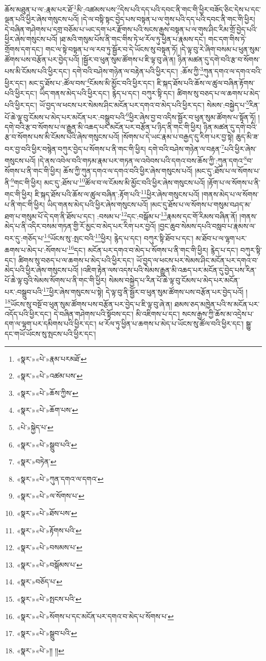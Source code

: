 ཆོས་མཐུན་པ་ལ་:རྣམ་པར་ཐོ་\footnote{«སྣར་»«པེ་»རྣམ་པརམཐོ་}མི་:འཚམས་པས་\footnote{«སྣར་»«པེ་»འཚམ་པས་}དེས་པའི་དད་པའི་དབང་ནི་གང་གི་ཕྱིར་བཟོད་ཅིང་དེས་པ་དང་ལྡན་པའི་ཕྱིར་ཞེས་གསུངས་པའོ། །དེ་ལ་བསྟི་སྟང་བྱེད་པས་བསྟན་པ་ལ་གུས་པའི་དད་པའི་དབང་ནི་གང་གི་ཕྱིར། དེ་བཞིན་གཤེགས་པ་དགྲ་བཅོམ་པ་ཡང་དག་པར་རྫོགས་པའི་སངས་རྒྱས་བསྟན་པ་ལ་གུས་ཤིང་རིམ་གྲོ་བྱེད་པའི་ཕྱིར་ཞེས་གསུངས་པའོ། །ཐ་མའི་གསུམ་པོས་ནི་གང་གིས་ཏེ་ཕ་རོལ་ཏུ་ཕྱིན་པ་རྣམས་དང་། གང་དག་གིས་ཏེ་གྲོགས་དག་དང་། གང་ལ་སྟེ་བསྟན་པ་ལ་རབ་ཏུ་སྦྱོར་བ་དེ་ཡོངས་སུ་བསྟན་ཏོ། །དེ་ལྟ་བུ་རེ་ཞིག་བསམ་པ་ཕུན་སུམ་ཚོགས་པས་བརྩོན་པར་བྱེད་པའོ། །སྦྱོར་བ་ཕུན་སུམ་ཚོགས་པ་ཇི་ལྟ་བུ་ཞེ་ན། ཉིན་མཚན་དུ་དགེ་བའི་རྩ་བ་སོགས་པས་མི་ངོམས་པའི་ཕྱིར་དང་། དགེ་བའི་བཤེས་གཉེན་ལ་བརྟེན་པའི་ཕྱིར་དང་། :ཆོས་ཀྱི་\footnote{«སྣར་»«པེ་»ཆོས་ཀྱིས་}ཀུན་དགའ་ལ་དགའ་བའི་ཕྱིར་དང་། མང་དུ་ཐོས་པ་:ཚོལ་བས་\footnote{«སྣར་»«པེ་»ཆོག་པས་}ངོམས་མི་མྱོང་བའི་ཕྱིར་དང་། ཇི་སྐད་ཐོས་པའི་ཆོས་ལ་ཚུལ་བཞིན་རྟོགས་པའི་ཕྱིར་དང་། ཡིད་གནས་མེད་པའི་ཕྱིར་དང་། རྙེད་པ་དང་། བཀུར་སྟི་དང་། ཚིགས་སུ་བཅད་པ་ལ་ཆགས་པ་མེད་པའི་ཕྱིར་དང་། ཡོ་བྱད་ལ་ཕངས་པར་སེམས་ཤིང་མངོན་པར་དགའ་བ་མེད་པའི་ཕྱིར་དང་། སེམས་:བསྐྱེད་པ་\footnote{«པེ་»སྐྱེད་པ་}རིན་པོ་ཆེ་ལྟ་བུ་ངོམས་པ་མེད་པར་མངོན་པར་:བསྒྲུབ་པའི་\footnote{«སྣར་»«པེ་»སྒྲུབ་པའི་}ཕྱིར་ཞེས་བྱ་བ་འདིས་སྦྱོར་བ་ཕུན་སུམ་ཚོགས་པ་སྟོན་ཏོ། །དགེ་བའི་རྩ་བ་སོགས་པ་ལ་རྒྱུན་མི་འཆད་པར་མངོན་པར་བརྩོན་པ་ཉིད་ནི་གང་གི་ཕྱིར། ཉིན་མཚན་དུ་དགེ་བའི་རྩ་བ་སོགས་པས་མི་ངོམས་པའི་ཞེས་གསུངས་པའོ། །སོགས་པ་དེ་ཡང་རྣམ་པ་བརྒྱད་དུ་རིག་པར་བྱ་སྟེ། ཆུད་མི་ཟ་བར་བྱ་བའི་ཕྱིར་བསྙེན་བཀུར་བྱེད་པ་སོགས་པ་ནི་གང་གི་ཕྱིར། དགེ་བའི་བཤེས་གཉེན་ལ་བརྟན་\footnote{«སྣར་»བཏེན་}པའི་ཕྱིར་ཞེས་གསུངས་པའོ། །དེ་ནས་འབེལ་བའི་གཏམ་རྣམ་པར་གཏན་ལ་འབེབས་པའི་དགའ་བས་ཆོས་ཀྱི་:ཀུན་དགའ་\footnote{«སྣར་»«པེ་»ཀུན་དགའ་ལ་དགའ་}བ་སོགས་པ་ནི་གང་གི་ཕྱིར། ཆོས་ཀྱི་ཀུན་དགའ་ལ་དགའ་བའི་ཕྱིར་ཞེས་གསུངས་པའོ། །མང་དུ་:ཐོས་པ་ལ་སོགས་པ་ནི་\footnote{«སྣར་»«པེ་»ལ་སོགས་པ་}གང་གི་ཕྱིར། མང་དུ་:ཐོས་པ་\footnote{«སྣར་»«པེ་»ཐོས་པས་}ཚོལ་བ་ལ་ངོམས་མི་མྱོང་བའི་ཕྱིར་ཞེས་གསུངས་པའོ། །རྟོག་པ་ལ་སོགས་པ་ནི་གང་གི་ཕྱིར། ཇི་སྐད་ཐོས་པའི་ཆོས་ལ་ཚུལ་བཞིན་:རྟོག་པའི་\footnote{«སྣར་»«པེ་»རྟོགས་པའི་}ཕྱིར་ཞེས་གསུངས་པའོ། །གནས་མེད་པ་ལ་སོགས་པ་ནི་གང་གི་ཕྱིར། ཡིད་གནས་མེད་པའི་ཕྱིར་ཞེས་གསུངས་པའོ། །མང་དུ་ཐོས་པ་ལ་སོགས་པ་གསུམ་བཤད་མ་ཐག་པ་གསུམ་པོ་དེ་དག་ནི་ཐོས་པ་དང་། :བསམ་པ་\footnote{«སྣར་»«པེ་»བསམས་པ་}དང་:བསྒོམ་པ་\footnote{«སྣར་»«པེ་»བསྒོམས་པ་}རྣམས་དང་གོ་རིམས་བཞིན་ནོ། །གནས་མེད་པ་ནི་འདིར་བསམ་གཏན་གྱི་རོ་མྱང་བ་མེད་པར་རིག་པར་བྱའོ། །བྱང་ཆུབ་སེམས་དཔའི་བསླབ་པ་རྣམས་ལ་བར་དུ་:གཅོད་པ་\footnote{«སྣར་»བཅོད་པ་}ཡོངས་སུ་:སྤང་བའི་\footnote{«སྣར་»«པེ་»སྤངས་པའི་}ཕྱིར། རྙེད་པ་དང་། བཀུར་སྟི་ཐོབ་པ་དང་། མ་ཐོབ་པ་ལ་ལྷག་པར་ཆགས་པ་མེད་པ་:སོགས་པ་\footnote{«སྣར་»«པེ་»སོགས་པ་དང་མངོན་པར་དགའ་བ་མེད་པ་སོགས་པ་}དང་། མངོན་པར་དགའ་བ་མེད་པ་སོགས་པ་ནི་གང་གི་ཕྱིར། རྙེད་པ་དང་། བཀུར་སྟི་དང་། ཚིགས་སུ་བཅད་པ་ལ་ཆགས་པ་མེད་པའི་ཕྱིར་དང་། ཡོ་བྱད་ལ་ཕངས་པར་སེམས་ཤིང་མངོན་པར་དགའ་བ་མེད་པའི་ཕྱིར་ཞེས་གསུངས་པའོ། །འཇིག་རྟེན་ལས་འདས་པའི་སེམས་རྒྱུན་མི་འཆད་པར་མངོན་དུ་བྱེད་པས་རིན་པོ་ཆེ་ལྟ་བུའི་སེམས་སོགས་པ་ནི་གང་གི་ཕྱིར། སེམས་བསྐྱེད་པ་རིན་པོ་ཆེ་ལྟ་བུ་ངོམས་པ་མེད་པར་མངོན་པར་:བསྒྲུབ་པའི་\footnote{«སྣར་»«པེ་»སྒྲུབ་པའི་}ཕྱིར་ཞེས་གསུངས་པ་སྟེ། དེ་ལྟ་བུ་ནི་སྦྱོར་བ་ཕུན་སུམ་ཚོགས་པས་བརྩོན་པར་བྱེད་པའོ། །\footnote{«སྣར་»«པེ་»།། །།}ཡོངས་སུ་བསྔོ་བ་ཕུན་སུམ་ཚོགས་པས་བརྩོན་པར་བྱེད་པ་ཇི་ལྟ་བུ་ཞེ་ན། ཐམས་ཅད་མཁྱེན་པའི་ས་མངོན་པར་འདོད་པའི་ཕྱིར་དང་། དེ་བཞིན་གཤེགས་པའི་སྟོབས་དང་། མི་འཇིགས་པ་དང་། སངས་རྒྱས་ཀྱི་ཆོས་མ་འདྲེས་པ་དག་ལ་ལྷག་པར་དམིགས་པའི་ཕྱིར་དང་། ཕ་རོལ་ཏུ་ཕྱིན་པ་ཆགས་པ་མེད་པ་ཡོངས་སུ་ཚོལ་བའི་ཕྱིར་དང་། སྒྱུ་དང་གཡོ་ཡོངས་སུ་སྤངས་པའི་ཕྱིར་དང་། 